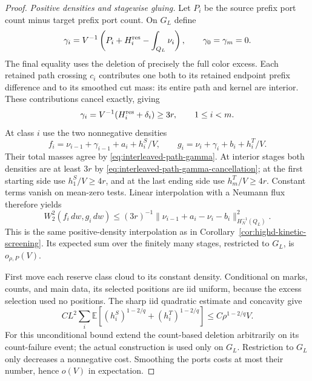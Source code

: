 \documentclass[11pt,reqno]{amsart}
\theoremstyle{definition}
\theoremstyle{remark}
\numberwithin{equation}{section}
\newcommand{\E}{\mathbb E}
\begin{document}
\begin{proof}
\emph{Positive densities and stagewise gluing.}
Let $P_i$ be the source prefix port count minus target prefix port count.
On $G_L$ define
\begin{equation}
 \gamma_i=V^{-1}\left(P_i+H_i^{\rm res}-\int_{Q_L}\nu_i\right),
 \qquad\gamma_0=\gamma_m=0.
 \label{eq:interleaved-path-gamma}
\end{equation}
The final equality uses the deletion of precisely the full color excess.
Each retained path crossing $c_i$ contributes one both to its retained
endpoint prefix difference and to its smoothed cut mass: its entire
path and kernel are interior. These contributions cancel exactly,
giving
\begin{equation}
 \gamma_i=V^{-1}(H_i^{\rm res}+\delta_i)\ge3r,
                         \qquad 1\le i<m.
 \label{eq:interleaved-path-gamma-cancellation}
\end{equation}
At class $i$ use the two nonnegative densities
\begin{equation}
 f_i=\nu_{i-1}+\gamma_{i-1}+a_i+h_i^S/V,
 \qquad
 g_i=\nu_i+\gamma_i+b_i+h_i^T/V.
 \label{eq:interleaved-path-stage-densities}
\end{equation}
Their total masses agree by \eqref{eq:interleaved-path-gamma}.
At interior stages both densities are at least $3r$ by
\eqref{eq:interleaved-path-gamma-cancellation}; at the first starting
side use $h_1^S/V\ge4r$, and at the last ending side use
$h_m^T/V\ge4r$. Constant terms vanish on mean-zero tests. Linear
interpolation with a Neumann flux therefore yields
\begin{equation}
 W_2^2(f_i\,dw,g_i\,dw)
 \le(3r)^{-1}
             \|\nu_{i-1}+a_i-\nu_i-b_i\|_{H_N^{-1}(Q_L)}^2.
 \label{eq:interleaved-path-stage-cost}
\end{equation}
This is the same positive-density interpolation as in
Corollary~\ref{cor:highd-kinetic-screening}. Its expected sum over
the finitely many stages, restricted to $G_L$, is $o_{\rho,P}(V)$.

First move each reserve class cloud to its constant density.
Conditional on marks, counts, and main data, its selected positions
are iid uniform, because the excess selection used no positions.
The sharp iid quadratic estimate and concavity give
\begin{equation}
 C L^2\sum_i\E[(h_i^S)^{1-2/q}+(h_i^T)^{1-2/q}]
                      \le C\rho^{1-2/q}V.
 \label{eq:interleaved-path-reserve-spreading}
\end{equation}
For this unconditional bound extend the count-based deletion
arbitrarily on its count-failure event; the actual construction is
used only on $G_L$. Restriction to $G_L$ only decreases a nonnegative
cost. Smoothing the ports costs at most their number, hence $o(V)$
in expectation.


\end{proof}
\end{document}
